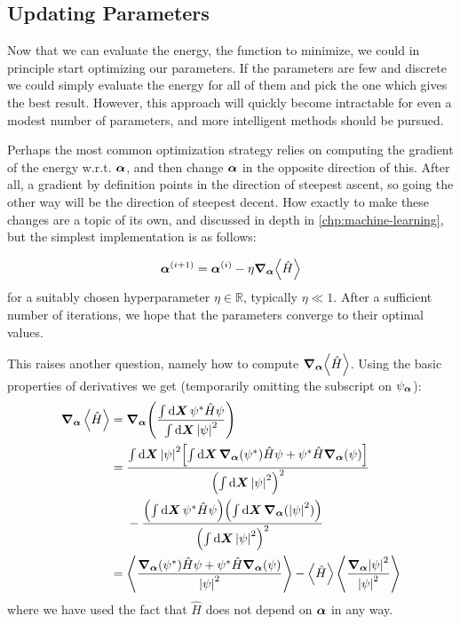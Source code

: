 \documentclass[Thesis.tex]{subfiles}
\begin{document}
\subsection{Updating Parameters}

Now that we can evaluate the energy, the function to minimize, we could in
principle start optimizing our parameters. If the parameters are few and
discrete we could simply evaluate the energy for all of them and pick the one
which gives the best result. However, this approach will quickly become
intractable for even a modest number of parameters, and more intelligent
methods should be pursued.

Perhaps the most common optimization strategy relies on computing the gradient
of the energy w.r.t. $\bm{\alpha}$, and then change $\bm{\alpha}$ in the opposite
direction of this. After all, a gradient by definition points in the direction
of steepest ascent, so going the other way will be the direction of steepest
decent. How exactly to make these changes are a topic of its own, and discussed in depth in \cref{chp:machine-learning}, but the simplest implementation is as follows:

\begin{align}
    \bm{\alpha}^{(i+1)} = \bm{\alpha}^{(i)} - \eta \grad_{\bm{\alpha}}{\expval{\hat H}}
\end{align}
for a suitably chosen hyperparameter $\eta\in\mathbb{R}$, typically $\eta\ll 1$. After a sufficient number of iterations, we hope that the parameters converge to their optimal values.

This raises another question, namely how to compute
$\grad_{\bm{\alpha}}{\expval{\hat H}}$. Using the basic properties of derivatives we get (temporarily omitting the subscript on $\psi_{\bm{\alpha}}$):
\begin{align}
    \grad_{\bm{\alpha}}\expval{\hat H} &= \grad_{\bm{\alpha}}\qty( \frac{\int\dd{\bm{X}}\psi^*\hat H\psi}{\int\dd{\bm{X}}\abs{\psi}^2})\\
    &= \frac{\int\dd{\bm{X}} \abs{\psi}^2 \qty[ \int\dd{\bm{X}}
    \grad_{\bm{\alpha}}(\psi^*)\hat H\psi +
    \psi^*\hat H\grad_{\bm{\alpha}}(\psi)
    ]}{\qty(\int\dd{\bm{X}}\abs{\psi}^2)^2}\\
    &\quad{ }\ -
    \frac{\qty(\int\dd{\bm{X}}\psi^*\hat
    H\psi)\qty(\int\dd{\bm{X}}\grad_{\bm{\alpha}}(\abs{\psi}^2))}{\qty(\int\dd{\bm{X}}\abs{\psi}^2)^2} \\
    &= \expval{\frac{\grad_{\bm{\alpha}}(\psi^*)\hat H\psi + \psi^*\hat H\grad_{\bm{\alpha}}(\psi)}{\abs{\psi}^2}}
    - \expval{\hat H}\expval{\frac{\grad_{\bm{\alpha}}\abs{\psi}^2}{\abs{\psi}^2}}
\end{align}
where we have used the fact that $\hat H$ does not depend on $\bm{\alpha}$ in any way.
\end{document}
